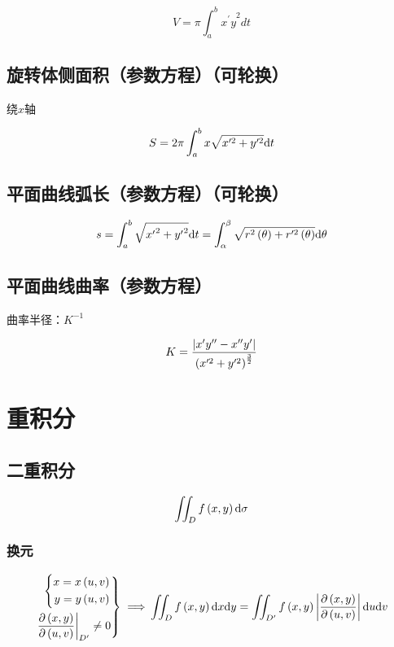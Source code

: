 \documentclass{article}
\begin{document}
\[V=\pi\int_a^b{{x^\prime y}^2dt}\]

\subsection{旋转体侧面积（参数方程）（可轮换）}

绕$x$轴

\[S=2\pi\int_a^b{x\sqrt{x^{\prime2}+y^{\prime2}}\mathrm d t}\]

\subsection{平面曲线弧长（参数方程）（可轮换）}

\[s=\int_a^b{\sqrt{{x^\prime}^2+{y^\prime}^2}\mathrm d t}=\int_{\alpha}^{\beta}{\sqrt{r^2\left(\theta\right)+r^{\prime2}\left(\theta\right)}\mathrm d\theta}\]

\subsection{平面曲线曲率（参数方程）}

曲率半径：$K^{-1}$

\[K=\frac{\left|x^\prime y^{\prime\prime}-x^{\prime\prime}y^\prime\right|}{\left(x^{\prime2}+y^{\prime2}\right)^\frac32}\]

\section{重积分}

\subsection{二重积分}

\begin{definition}[$\d\sigma=\d x\d y$]
    \[\iint_Df\left(x,y\right)\mathrm d\sigma\]
\end{definition}

\subsubsection{换元}

\[\left.\begin{aligned}
        \left\{\begin{aligned}
                   x=x\left(u,v\right) \\
                   y=y\left(u,v\right)
               \end{aligned}\right. \\
        \left.\frac{\partial\left(x,y\right)}{\partial\left(u,v\right)}\right|_{D^\prime}\neq0
    \end{aligned}\right\}\implies\\
    \iint_Df\left(x,y\right)\mathrm d x\mathrm d y=
    \iint_{D^\prime}f\left(x,y\right)\left|\frac{\partial\left(x,y\right)}{\partial\left(u,v\right)}\right|\mathrm d u\mathrm d v\]
\end{document}
